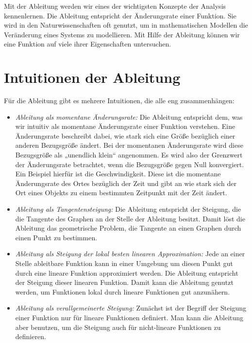 \documentclass[fontsize=9pt,
               parskip=half-,
               DIV=14,
               listof=chapterentry,
               tocflat]{scrbook}
\begin{document}
Mit der Ableitung werden wir eines der wichtigsten Konzepte der Analysis kennenlernen. Die Ableitung entspricht der Änderungsrate einer Funktion. Sie wird in den Naturwissenschaften oft genutzt, um in mathematischen Modellen die Veränderung eines Systems zu modellieren. Mit Hilfe der Ableitung können wir eine Funktion auf viele ihrer Eigenschaften untersuchen.

\section{Intuitionen der Ableitung}

Für die Ableitung gibt es mehrere Intuitionen, die alle eng zusammenhängen:

\begin{itemize}
\item \emph{Ableitung als momentane Änderungsrate:} Die Ableitung entspricht dem, was wir intuitiv als momentane Änderungsrate einer Funktion verstehen. Eine Änderungsrate beschreibt dabei, wie stark sich eine Größe bezüglich einer anderen Bezugsgröße ändert. Bei der momentanen Änderungsrate wird diese Bezugsgröße als „unendlich klein“ angenommen. Es wird also der Grenzwert der Änderungsrate betrachtet, wenn die Bezugsgröße gegen Null konvergiert. Ein Beispiel hierfür ist die Geschwindigkeit. Diese ist die momentane Änderungsrate des Ortes bezüglich der Zeit und gibt an wie stark sich der Ort eines Objekts zu einem bestimmten Zeitpunkt mit der Zeit ändert.
\item \emph{Ableitung als Tangentensteigung:} Die Ableitung entspricht der Steigung, die die Tangente des Graphen an der Stelle der Ableitung besitzt. Damit löst die Ableitung das geometrische Problem, die Tangente an einen Graphen durch einen Punkt zu bestimmen.
\item \emph{Ableitung als Steigung der lokal besten linearen Approximation:} Jede an einer Stelle ableitbare Funktion kann in einer Umgebung um diesen Punkt gut durch eine lineare Funktion approximiert werden. Die Ableitung entspricht der Steigung dieser linearen Funktion. Damit kann die Ableitung genutzt werden, um Funktionen lokal durch lineare Funktionen gut anzunähern.
\item \emph{Ableitung als verallgemeinerte Steigung:} Zunächst ist der Begriff der Steigung einer Funktion nur für lineare Funktionen definiert. Man kann die Ableitung aber benutzen, um die Steigung auch für nicht-lineare Funktionen zu definieren.
\end{itemize}
\end{document}
